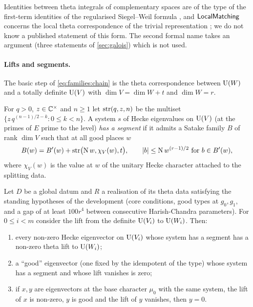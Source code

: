 \begin{remark}\label{rem:families:K}
Identities between theta integrals of complementary spaces are of the type of the first-term identities of the
regularised Siegel--Weil formula \cite{KudlaRallis1994,Ichino2004,GanQiuTakeda2014,Yamana2014}, and
$\mathsf{LocalMatching}$ concerns the local theta correspondence of the trivial representation
\cite{HarrisKudlaSweet1996,KudlaSweet1997,Minguez2008}; we do not know a published statement of this form. The
second formal name takes an argument (three statements of \cref{sec:galois}) which is not used.
\end{remark}

\paragraph{Lifts and segments.}
The basic step of \eqref{eq:families:chain} is the theta correspondence between $\operatorname{U}(W)$ and a totally
definite $\operatorname{U}(V)$ with $\dim V=\dim W+t$ and $\dim W=r$.

\begin{definition}[Segments]\label{def:families:string}
For $q>0$, $z\in\mathbb{C}^\times$ and $n\ge1$ let $\operatorname{str}(q,z,n)$ be the multiset
$\{z\,q^{(n-1)/2-k}:0\le k<n\}$. A system $s$ of Hecke eigenvalues on $\operatorname{U}(V)$ (at the primes of $E$ prime to
the level) \emph{has a segment} if it admits a Satake family $B$ of rank $\dim V$ such that at all good places
$w$
\[
B(w)=B'(w)+\operatorname{str}\bigl(\operatorname{N} w,\chi_V(w),t\bigr),\qquad |b|\le\operatorname{N} w^{(r-1)/2}\ \text{for } b\in B'(w),
\]
where $\chi_V(w)$ is the value at $w$ of the unitary Hecke character attached to the splitting data.
\end{definition}

\begin{proposition}\Fmark\label{prop:families:liftinj}
Let $D$ be a global datum and $R$ a realisation of its theta data satisfying the standing hypotheses of the
development (core conditions, good types at $g_0,g_1$, and a gap of at least $100r^4$ between consecutive
Harish-Chandra parameters). For $0\le i<m$ consider the lift from the definite $\operatorname{U}(V_i)$ to $\operatorname{U}(W_i)$. Then:
\begin{enumerate}[label=(\alph*)]
\item every non-zero Hecke eigenvector on $\operatorname{U}(V_i)$ whose system has a segment has a non-zero theta lift to
$\operatorname{U}(W_i)$;
\item a ``good'' eigenvector (one fixed by the idempotent of the type) whose system has a segment and whose lift
vanishes is zero;
\item if $x,y$ are eigenvectors at the base character $\mu_0$ with the same system, the lift of $x$ is non-zero,
$y$ is good and the lift of $y$ vanishes, then $y=0$.
\end{enumerate}
\end{proposition}

